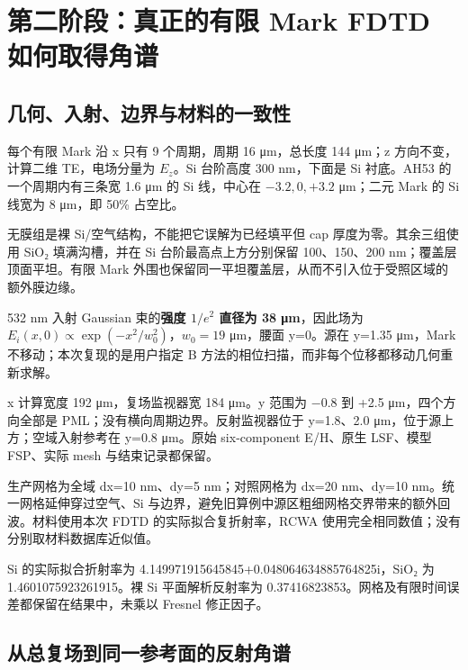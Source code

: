 \documentclass[
  chinese,
  UTF8,
  a4paper,
  11pt]{ctexart}
\begin{document}
\section{第二阶段：真正的有限 Mark FDTD
如何取得角谱}\label{ux7b2cux4e8cux9636ux6bb5ux771fux6b63ux7684ux6709ux9650-mark-fdtd-ux5982ux4f55ux53d6ux5f97ux89d2ux8c31}

\subsection{几何、入射、边界与材料的一致性}\label{ux51e0ux4f55ux5165ux5c04ux8fb9ux754cux4e0eux6750ux6599ux7684ux4e00ux81f4ux6027}

每个有限 Mark 沿 x 只有 9 个周期，周期 16 μm，总长度 144 μm；z
方向不变，计算二维 TE，电场分量为 \(E_z\)。Si 台阶高度 300 nm，下面是 Si
衬底。AH53 的一个周期内有三条宽 1.6 μm 的 Si 线，中心在 \(-3.2,0,+3.2\)
μm；二元 Mark 的 Si 线宽为 8 μm，即 50\% 占空比。

无膜组是裸 Si/空气结构，不能把它误解为已经填平但 cap
厚度为零。其余三组使用 SiO₂ 填满沟槽，并在 Si 台阶最高点上方分别保留
100、150、200 nm；覆盖层顶面平坦。有限 Mark
外围也保留同一平坦覆盖层，从而不引入位于受照区域的额外膜边缘。

532 nm 入射 Gaussian 束的\textbf{强度 \(1/e^2\) 直径为 38 μm}，因此场为
\(E_i(x,0)\propto\exp(-x^2/w_0^2)\)，\(w_0=19\) μm，腰面 y=0。源在
y=1.35 μm，Mark 不移动；本次复现的是用户指定 B
方法的相位扫描，而非每个位移都移动几何重新求解。

x 计算宽度 192 μm，复场监视器宽 184 μm。y 范围为 −0.8 到 +2.5
μm，四个方向全部是 PML；没有横向周期边界。反射监视器位于 y=1.8、2.0
μm，位于源上方；空域入射参考在 y=0.8 μm。原始 six-component E/H、原生
LSF、模型 FSP、实际 mesh 与结束记录都保留。

生产网格为全域 dx=10 nm、dy=5 nm；对照网格为 dx=20 nm、dy=10
nm。统一网格延伸穿过空气、Si
与边界，避免旧算例中源区粗细网格交界带来的额外回波。材料使用本次 FDTD
的实际拟合复折射率，RCWA 使用完全相同数值；没有分别取材料数据库近似值。

Si 的实际拟合折射率为 4.149971915645845+0.048064634885764825i，SiO₂ 为
1.4601075923261915。裸 Si 平面解析反射率为
0.37416823853。网格及有限时间误差都保留在结果中，未乘以 Fresnel
修正因子。

\subsection{从总复场到同一参考面的反射角谱}\label{ux4eceux603bux590dux573aux5230ux540cux4e00ux53c2ux8003ux9762ux7684ux53cdux5c04ux89d2ux8c31}
\end{document}
